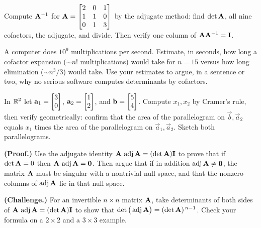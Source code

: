 \begin{exercise}\label{ch22:ex-adj3x3}
Compute $\mathbf{A}^{-1}$ for $\mathbf{A}=\begin{bmatrix} 2 & 0 & 1 \\ 1 & 1 & 0 \\ 0 & 1 & 3\end{bmatrix}$ by
the adjugate method: find $\det\mathbf{A}$, all nine cofactors, the adjugate, and divide. Then verify one
column of $\mathbf{A}\mathbf{A}^{-1}=\mathbf{I}$.
\end{exercise}

\begin{exercise}\label{ch22:ex-cost}
A computer does $10^9$ multiplications per second. Estimate, in seconds, how long a cofactor expansion
($\sim n!$ multiplications) would take for $n=15$ versus how long elimination ($\sim n^3/3$) would
take. Use your estimates to argue, in a sentence or two, why no serious software computes determinants
by cofactors.
\end{exercise}

\begin{exercise}\label{ch22:ex-geom-cramer}
In $\mathbb{R}^2$ let $\mathbf{a}_1=\begin{bmatrix}3\\0\end{bmatrix}$, $\mathbf{a}_2=\begin{bmatrix}1\\2\end{bmatrix}$, and $\mathbf{b}=\begin{bmatrix}5\\4\end{bmatrix}$. Compute
$x_1,x_2$ by Cramer's rule, then verify geometrically: confirm that the area of the parallelogram on
$\vec b,\vec a_2$ equals $x_1$ times the area of the parallelogram on $\vec a_1,\vec a_2$. Sketch both
parallelograms.
\end{exercise}

\begin{exercise}\label{ch22:ex-proof-singular}
\textbf{(Proof.)} Use the adjugate identity $\mathbf{A}\,\operatorname{adj}\mathbf{A}=(\det\mathbf{A})\mathbf{I}$ to
prove that if $\det\mathbf{A}=0$ then $\mathbf{A}\,\operatorname{adj}\mathbf{A}=\mathbf{0}$. Then argue that if in
addition $\operatorname{adj}\mathbf{A}\neq\mathbf{0}$, the matrix $\mathbf{A}$ must be singular with a nontrivial
null space, and that the nonzero columns of $\operatorname{adj}\mathbf{A}$ lie in that null space.
\end{exercise}

\begin{exercise}\label{ch22:ex-proof-detadj}
\textbf{(Challenge.)} For an invertible $n\times n$ matrix $\mathbf{A}$, take determinants of both sides
of $\mathbf{A}\,\operatorname{adj}\mathbf{A}=(\det\mathbf{A})\mathbf{I}$ to show that
$\det\big(\operatorname{adj}\mathbf{A}\big)=(\det\mathbf{A})^{\,n-1}$. Check your formula on a $2\times2$ and a
$3\times3$ example.
\end{exercise}
